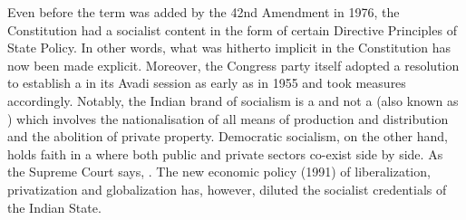 Even before the term was added by the 42nd Amendment in 1976, the Constitution had a socialist content in the form of certain Directive Principles of State Policy. In other words, what was hitherto implicit in the Constitution has now been made explicit. Moreover, the Congress party itself adopted a resolution to establish a  in its Avadi session as early as in 1955 and took measures accordingly. Notably, the Indian brand of socialism is a  and not a  (also known as ) which involves the nationalisation of all means of production and distribution and the abolition of private property. Democratic socialism, on the other hand, holds faith in a  where both public and private sectors co-exist side by side. As the Supreme Court says, . The new economic policy (1991) of liberalization, privatization and globalization has, however, diluted the socialist credentials of the Indian State.


\theendnotes
\cleardoublepage

